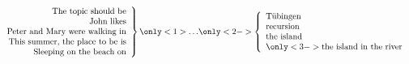 \documentclass[xcolor=table]{beamer}
\begin{document}


\begin{frame}%
\[
\left.
  \begin{array}[c]{r}
    \mbox{The topic should be}\\
    \mbox{John likes}\\
\mbox{Peter and Mary were walking in}\\
\mbox{This summer, the place to be is}\\
\mbox{Sleeping on the beach on}\\
  \end{array}
\right\} \only<1>{\ldots}
\only<2->{
\left\{
  \begin{array}[c]{l}
    \mbox{T\"ubingen}\\
\mbox{recursion}\\
\mbox{the island}\\
\only<3->{\mbox{the island in the river}}\\
  \end{array}
\right.
}
\]
\end{frame}
\end{document}
